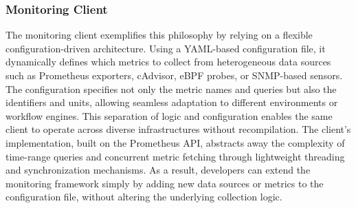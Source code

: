 \subsubsection{Monitoring Client}
\label{sec:monitoring_client}
The monitoring client exemplifies this philosophy by relying on a flexible configuration-driven architecture. Using a YAML-based configuration file, it dynamically defines which metrics to collect from heterogeneous data sources such as Prometheus exporters, cAdvisor, eBPF probes, or SNMP-based sensors. The configuration specifies not only the metric names and queries but also the identifiers and units, allowing seamless adaptation to different environments or workflow engines. This separation of logic and configuration enables the same client to operate across diverse infrastructures without recompilation. The client’s implementation, built on the Prometheus API, abstracts away the complexity of time-range queries and concurrent metric fetching through lightweight threading and synchronization mechanisms. As a result, developers can extend the monitoring framework simply by adding new data sources or metrics to the configuration file, without altering the underlying collection logic.

